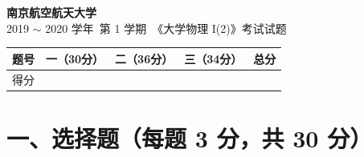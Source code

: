 \documentclass[zihao=5,a4paper,UTF8]{ctexart}
\begin{document}
\begin{center}
    {\Large\bfseries 南京航空航天大学}\\[4pt]
    {\large 2019 $\sim$ 2020 学年\ 第 1 学期\ 《大学物理 I(2)》考试试题}
\end{center}

\begin{center}
\begin{tabular}{|c|c|c|c|c|}
\hline
题号 & 一（30分） & 二（36分） & 三（34分） & 总分 \\
\hline
得分 & \hspace{2.2cm} & \hspace{2.2cm} & \hspace{2.2cm} & \hspace{2.2cm} \\
\hline
\end{tabular}
\end{center}

\section*{一、选择题（每题 3 分，共 30 分）}
\end{document}
